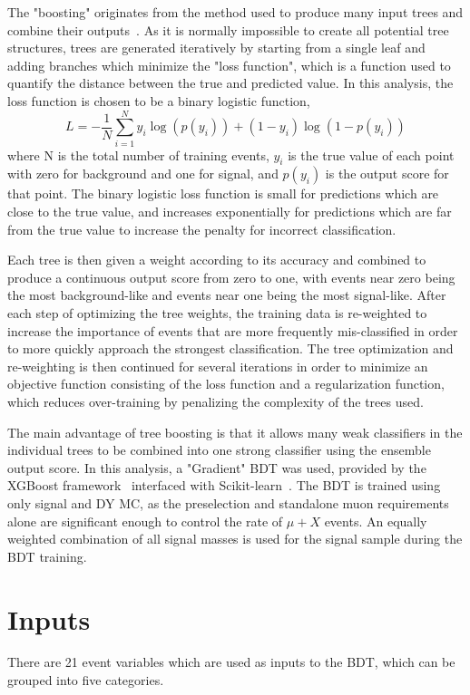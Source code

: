 The "boosting" originates from the method used to produce many input trees and combine their outputs~\cite{GradBoost}. 
As it is normally impossible to create all potential tree structures, trees are generated iteratively by starting from a single leaf and adding branches which minimize the "loss function", which is a function used to quantify the distance between the true and predicted value.
In this analysis, the loss function is chosen to be a binary logistic function,
\begin{equation}
	\label{binLogFunc}
	L = - \frac{1}{N} \sum_{i=1}^{N} y_i \log(p(y_i)) + (1-y_i) \log(1-p(y_i))
\end{equation} 
where N is the total number of training events, $y_i$ is the true value of each point with zero for background and one for signal, and $p(y_i)$ is the output score for that point.
The binary logistic loss function is small for predictions which are close to the true value, and increases exponentially for predictions which are far from the true value to increase the penalty for incorrect classification.

Each tree is then given a weight according to its accuracy and combined to produce a continuous output score from zero to one, with events near zero being the most background-like and events near one being the most signal-like. 
After each step of optimizing the tree weights, the training data is re-weighted to increase the importance of events that are more frequently mis-classified in order to more quickly approach the strongest classification.
The tree optimization and re-weighting is then continued for several iterations in order to minimize an objective function consisting of the loss function and a regularization function, which reduces over-training by penalizing the complexity of the trees used.

The main advantage of tree boosting is that it allows many weak classifiers in the individual trees to be combined into one strong classifier using the ensemble output score.
In this analysis, a "Gradient" BDT was used, provided by the XGBoost framework~\cite{XGBoost} interfaced with Scikit-learn~\cite{scikit}. The BDT is trained using only signal and DY MC, as the preselection and standalone muon requirements alone are significant enough to control the rate of $\mu+X$ events. 
An equally weighted combination of all signal masses is used for the signal sample during the BDT training.

\section{Inputs}
There are 21 event variables which are used as inputs to the BDT, which can be grouped into five categories.

